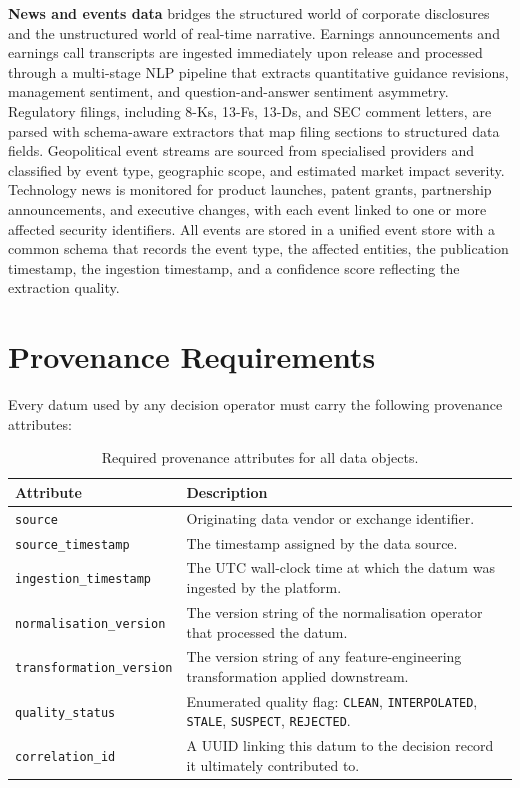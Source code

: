 \documentclass[12pt,openany]{book}
\numberwithin{equation}{chapter}
\theoremstyle{plain}
\theoremstyle{definition}
\theoremstyle{remark}
\begin{document}
\textbf{News and events data} bridges the structured world of corporate disclosures and the unstructured world of real-time narrative. Earnings announcements and earnings call transcripts are ingested immediately upon release and processed through a multi-stage NLP pipeline that extracts quantitative guidance revisions, management sentiment, and question-and-answer sentiment asymmetry. Regulatory filings, including 8-Ks, 13-Fs, 13-Ds, and SEC comment letters, are parsed with schema-aware extractors that map filing sections to structured data fields. Geopolitical event streams are sourced from specialised providers and classified by event type, geographic scope, and estimated market impact severity. Technology news is monitored for product launches, patent grants, partnership announcements, and executive changes, with each event linked to one or more affected security identifiers. All events are stored in a unified event store with a common schema that records the event type, the affected entities, the publication timestamp, the ingestion timestamp, and a confidence score reflecting the extraction quality.



\section{Provenance Requirements}

Every datum used by any decision operator must carry the following provenance
attributes:

\begin{table}[H]
\centering
\caption{Required provenance attributes for all data objects.}
\label{tab:provenance}
\small
\begin{tabularx}{\textwidth}{p{4.75cm} X}
\toprule
\textbf{Attribute} & \textbf{Description} \\
\midrule
\texttt{source} & Originating data vendor or exchange identifier. \\
\texttt{source\_timestamp} & The timestamp assigned by the data source. \\
\texttt{ingestion\_timestamp} & The UTC wall-clock time at which the datum
    was ingested by the platform. \\
\texttt{normalisation\_version} & The version string of the normalisation
    operator that processed the datum. \\
\texttt{transformation\_version} & The version string of any feature-engineering
    transformation applied downstream. \\
\texttt{quality\_status} & Enumerated quality flag: \texttt{CLEAN},
    \texttt{INTERPOLATED}, \texttt{STALE}, \texttt{SUSPECT}, \texttt{REJECTED}. \\
\texttt{correlation\_id} & A UUID linking this datum to the decision record
    it ultimately contributed to. \\
\bottomrule
\end{tabularx}
\end{table}
\end{document}
